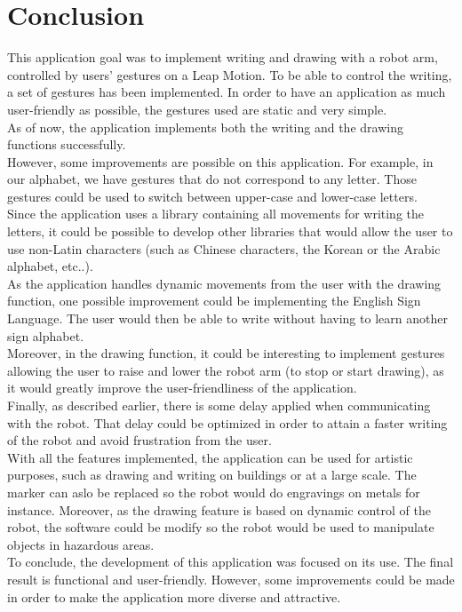 \section{Conclusion}
This application goal was to implement writing and drawing with a robot arm, controlled by users' gestures on a Leap Motion. To be able to control the writing, a set of gestures has been implemented. In order to have an application as much user-friendly as possible, the gestures used are static and very simple.\\
As of now, the application implements both the writing and the drawing functions successfully.\\

However, some improvements are possible on this application. For example, in our alphabet, we have gestures that do not correspond to any letter. Those gestures could be used to switch between upper-case and lower-case letters.\\
Since the application uses a library containing all movements for writing the letters, it could be possible to develop other libraries that would allow the user to use non-Latin characters (such as Chinese characters, the Korean or the Arabic alphabet, etc..).\\

As the application handles dynamic movements from the user with the drawing function, one possible improvement could be implementing the English Sign Language. The user would then be able to write without having to learn another sign alphabet.\\
Moreover, in the drawing function, it could be interesting to implement gestures allowing the user to raise and lower the robot arm (to stop or start drawing), as it would greatly improve the user-friendliness of the application.\\

Finally, as described earlier, there is some delay applied when communicating with the robot. That delay could be optimized in order to attain a faster writing of the robot and avoid frustration from the user.\\

With all the features implemented, the application can be used for artistic purposes, such as drawing and writing on buildings or at a large scale. The marker can aslo be replaced so the robot would do engravings on metals for instance. Moreover, as the drawing feature is based on dynamic control of the robot, the software could be modify so the robot would be used to manipulate objects in hazardous areas.\\

To conclude, the development of this application was focused on its use. The final result is functional and user-friendly. However, some improvements could be made in order to make the application more diverse and attractive.
